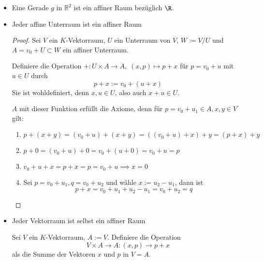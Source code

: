 \documentclass{mycourse}
\begin{document}
\begin{ex}
\begin{itemize}
\item Eine Gerade $g$ in $\mathbb R ^2$ ist ein affiner Raum bezüglich $\R$.
\item Jeder affine Unterraum ist ein affiner Raum

	\begin{proof}
		Sei $V$ ein $K$-Vektorraum, $U$ ein Unterraum von $V$, $W:=V/U$ und $A = v_0 + U \subset W$ ein affiner Unterraum.

Definiere die Operation $+: U\times A\to A,\; (x,p)\mapsto p+x$ für $p = v_0 + u$ mit $u\in U$ durch
\[
p+x := v_0 + (u+x) 
\]
Sie ist wohldefiniert, denn $x,u\in U$, also auch $x+u\in U$.

$A$ mit dieser Funktion erfüllt die Axiome, denn für $p=v_0+u_1\in A, x,y\in V$ gilt:
\begin{enumerate}[{A}1:]
	\item $p+(x+y) = (v_0+u)+(x+y) = ((v_0+u)+x)+y = (p+x)+y$
	\item $p+0 = (v_0+u)+0=v_0+(u+0)=v_0+u=p$
	\item $v_0+u+x=p+x=p=v_0+u \implies x=0$
	\item Sei $p=v_0+u_1, q=v_0+u_2$ und wähle $x:= u_2-u_1$, dann ist
		\[
			p+x = v_0+u_1+u_2-u_1 = v_0+u_2 = q
		\]
\end{enumerate}
\end{proof}

\item Jeder Vektorraum ist selbst ein affiner Raum

Sei $V$ ein $K$-Vektorraum, $A := V$. Definiere die Operation
\[
V\times A \rightarrow A : (x,p) \rightarrow p+x
\]
als die Summe der Vektoren $x$ und $p$ in $V=A$.
\end{itemize}
\end{ex}
\end{document}
